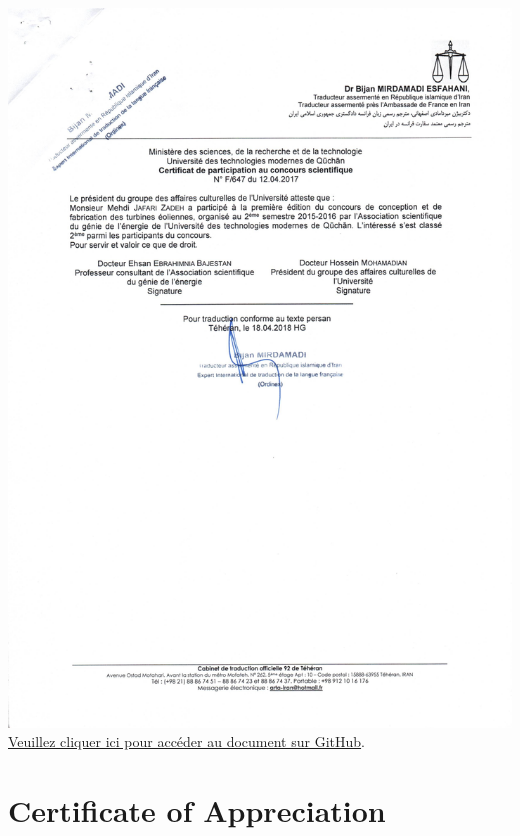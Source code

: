 \documentclass{article}
\begin{document}
        \begin{center}
            \includegraphics[width=\textwidth,height=\textheight,keepaspectratio]{../Document/Scientific Competitions/Design and Manufacturing of Wind Turbines/12-04-2017 certificat de participation au concours.jpg}
            \footnotesize
             \href{https://github.com/jafarizadeh/CV---lettre/tree/903818f42bc563b419f3283c49cc84e05cf3932d/Document/Scientific%20Competitions/Design%20and%20Manufacturing%20of%20Wind%20Turbines}{Veuillez cliquer ici pour accéder au document sur GitHub}.
        \end{center}
    \newpage




\section{Certificate of Appreciation}
\end{document}
